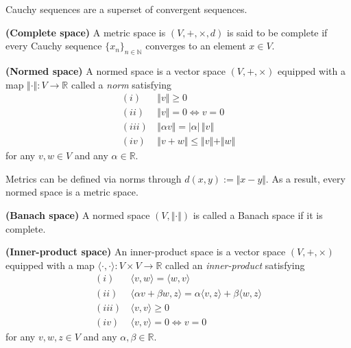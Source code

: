 Cauchy sequences are a superset of convergent sequences.

\begin{definition}
	\textbf{(Complete space)}
	A metric space is $(V,+,\times,d)$ is said to be complete if every Cauchy sequence $\{x_n\}_{n\in\mathbb{N}}$ converges to an element $x \in V$.
\end{definition}


\begin{definition}
	\textbf{(Normed space)}
	A normed space is a vector space $(V,+,\times)$ equipped with a map $\Vert \cdot \Vert: V \rightarrow \mathbb{R}$ called a \textit{norm} satisfying
	\begin{align}
	(i) \, &\Vert v \Vert \geq 0 \\
	(ii) \, &\Vert v \Vert = 0 \Leftrightarrow v = 0\\
	(iii) \, &\Vert \alpha v \Vert = |\alpha| \, \Vert v \Vert \\
	(iv) \, &\Vert  v + w \Vert \leq \Vert v \Vert + \Vert w \Vert
	\end{align}
	for any $v,w \in V$ and any $\alpha \in \mathbb{R}$.
\end{definition}

Metrics can be defined via norms through $d(x,y) := \Vert x - y\Vert$. As a result, every normed space is a metric space.

\begin{definition}
	\textbf{(Banach space)}
	A normed space $(V,\Vert \cdot \Vert)$ is called a Banach space if it is complete.
\end{definition}

\begin{definition}
	\textbf{(Inner-product space)}
	An inner-product space is a vector space $(V,+,\times)$ equipped with a map $\langle \cdot, \cdot \rangle : V \times V \rightarrow \mathbb{R}$ called an \textit{inner-product} satisfying
	\begin{align}
		(i) \, &\langle v, w \rangle = \langle w, v \rangle\\
		(ii) \, &\langle \alpha v + \beta w, z \rangle = \alpha \langle v, z \rangle + \beta \langle w, z \rangle\\
		(iii) \, &\langle v, v \rangle \geq 0 \\
		(iv) \, &\langle v, v \rangle = 0 \Leftrightarrow v = 0
	\end{align}
	for any $v,w,z \in V$ and any $\alpha, \beta \in \mathbb{R}$.
\end{definition}

